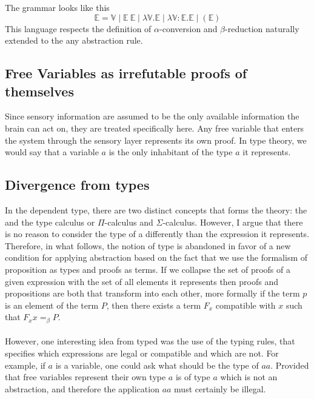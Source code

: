 \medskip

\noindent The grammar looks like this
\[
\mathbb{E} = \mathbb{V} \mid \mathbb{E}\ \mathbb{E} \mid \lambda \mathbb{V}.\mathbb{E} \mid \lambda \mathbb{V}\colon\mathbb{E}.\mathbb{E} \mid (\mathbb{E})
\]
This language respects the definition of $\alpha$-conversion and $\beta$-reduction naturally extended to the any abstraction rule.

\subsection{Free Variables as irrefutable proofs of themselves}

Since sensory information are assumed to be the only available information the brain can act on, they are treated specifically here. Any free variable that enters the system through the sensory layer represents its own proof. In type theory, we would say that a variable $a$ is the only inhabitant of the type $a$ it represents.

\subsection{Divergence from types}

In the dependent type, there are two distinct concepts that forms the theory: the \lcalc and the type calculus or $\Pi$-calculus and $\Sigma$-calculus. However, I argue that there is no reason to consider the type of a \lterm differently than the expression it represents. Therefore, in what follows, the notion of type is abandoned in favor of a new condition for applying abstraction based on the fact that we use the formalism of proposition as types and proofs as terms. If we collapse the set of proofs of a given expression with the set of all elements it represents then proofs and propositions are both \lterms that transform into each other, more formally if the term $p$ is an element of the term $P$, then there exists a term $F_{x}$ compatible with $x$ such that $F_{x}x=_{\beta} P$.\\
\\
However, one interesting idea from typed \lcalc was the use of the typing rules, that specifies which expressions are legal or compatible and which are not. For example, if $a$ is a variable, one could ask what should be the type of $aa$. Provided that free variables represent their own type $a$ is of type $a$ which is not an abstraction, and therefore the application $aa$ must certainly be illegal.

